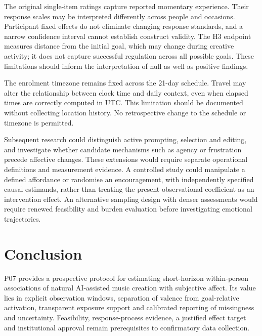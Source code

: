 \documentclass[11pt]{article}
\begin{document}
The original single-item ratings capture reported momentary experience. Their response scales may be interpreted differently across people and occasions. Participant fixed effects do not eliminate changing response standards, and a narrow confidence interval cannot establish construct validity. The H3 endpoint measures distance from the initial goal, which may change during creative activity; it does not capture successful regulation across all possible goals. These limitations should inform the interpretation of null as well as positive findings.

The enrolment timezone remains fixed across the 21-day schedule. Travel may alter the relationship between clock time and daily context, even when elapsed times are correctly computed in UTC. This limitation should be documented without collecting location history. No retrospective change to the schedule or timezone is permitted.

Subsequent research could distinguish active prompting, selection and editing, and investigate whether candidate mechanisms such as agency or frustration precede affective changes. These extensions would require separate operational definitions and measurement evidence. A controlled study could manipulate a defined affordance or randomise an encouragement, with independently specified causal estimands, rather than treating the present observational coefficient as an intervention effect. An alternative sampling design with denser assessments would require renewed feasibility and burden evaluation before investigating emotional trajectories.

\section{Conclusion}
P07 provides a prospective protocol for estimating short-horizon within-person associations of natural AI-assisted music creation with subjective affect. Its value lies in explicit observation windows, separation of valence from goal-relative activation, transparent exposure support and calibrated reporting of missingness and uncertainty. Feasibility, response-process evidence, a justified effect target and institutional approval remain prerequisites to confirmatory data collection.

\printbibliography
\end{document}
